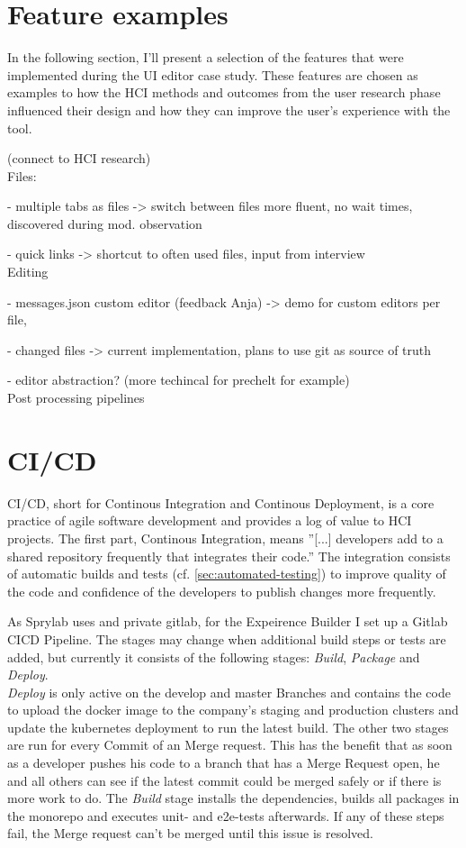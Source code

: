 \section{Feature examples}

In the following section, I'll present a selection of the features that were implemented during the UI editor case study.
These features are chosen as examples to how the HCI methods and outcomes from the user research phase influenced their design and how they can improve the user's experience with the tool. 

(connect to HCI research)
\\
Files:

- multiple tabs as files -> switch between files more fluent, no wait times, discovered during mod. observation

- quick links -> shortcut to often used files, input from interview
\\
Editing

- messages.json custom editor (feedback Anja) -> demo for custom editors per file, 

- changed files -> current implementation, plans to use git as source of truth

- editor abstraction? (more techincal for prechelt for example)
\\
Post processing pipelines


\section{CI/CD}

CI/CD, short for Continous Integration and Continous Deployment, is a core practice of agile software development and provides a log of value to
HCI projects. The first part, Continous Integration, means ''[...] developers add to a shared repository frequently that integrates their code.'' \cite[p. 81]{LearnHCI:2020ys}
The integration consists of automatic builds and tests (cf. \ref*{sec:automated-testing}) to improve quality of the code and confidence of the developers to publish changes more frequently.

As Sprylab uses and private gitlab, for the Expeirence Builder I set up a Gitlab CICD Pipeline. The stages may change when additional build steps or tests are added, but currently it consists of the following stages: \textit{Build}, \textit{Package} and \textit{Deploy}.
\\
\textit{Deploy} is only active on the develop and master Branches and contains the code to upload the docker image to the company's staging and production clusters and update the kubernetes deployment to run the latest build.
The other two stages are run for every Commit of an Merge request. This has the benefit that as soon as a developer pushes his code to a branch that has a Merge Request open,
he and all others can see if the latest commit could be merged safely or if there is more work to do.
The \textit{Build} stage installs the dependencies, builds all packages in the monorepo and executes unit- and e2e-tests afterwards. If any of these steps fail, the Merge request can't be merged until this issue is resolved.

